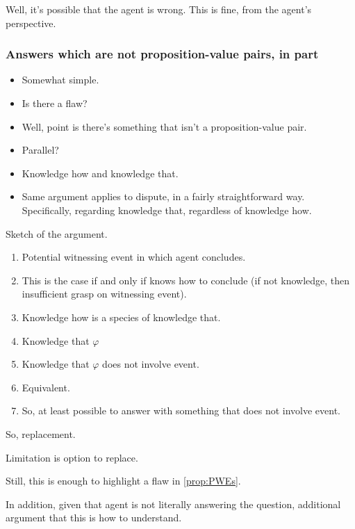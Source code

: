 \begin{note}
  Well, it's possible that the agent is wrong.
  This is fine, from the agent's perspective.
\end{note}


\subsubsection{Answers which are not proposition-value pairs, in part}
\label{sec:answers-which-are}

\begin{note}
  \begin{itemize}
  \item
    Somewhat simple.
  \item
    Is there a flaw?
  \item
    Well, point is there's something that isn't a proposition-value pair.
  \item
    Parallel?
  \item
    Knowledge how and knowledge that.
  \item
    Same argument applies to dispute, in a fairly straightforward way.
    Specifically, regarding knowledge that, regardless of knowledge how.
  \end{itemize}
\end{note}

\begin{note}
  Sketch of the argument.

  \begin{enumerate}
  \item
    Potential witnessing event in which agent concludes.
  \item
    \label{pwe-iff-kh}
    This is the case if and only if knows how to conclude (if not knowledge, then insufficient grasp on witnessing event).
  \item
    \label{kw-is-kt}
    Knowledge how is a species of knowledge that.
  \item
    Knowledge that \(\varphi\)
  \item
    Knowledge that \(\varphi\) does not involve event.
  \item
    Equivalent.
  \item
    So, at least possible to answer with something that does not involve event.
  \end{enumerate}

  So, replacement.

  Limitation is option to replace.

  Still, this is enough to highlight a flaw in \autoref{prop:PWEs}.

  In addition, given that agent is not literally answering the question, additional argument that this is how to understand.
\end{note}

